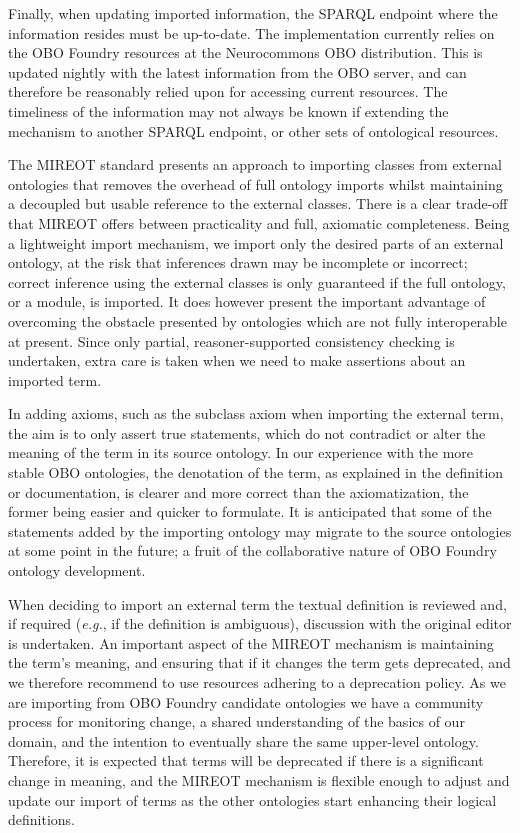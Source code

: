 \documentclass[jou]{ao2e}%
\begin{document}
Finally, when updating imported information, the SPARQL endpoint where the information resides must be up-to-date. The implementation currently relies on the \ac{OBO} Foundry resources at the Neurocommons \ac{OBO} distribution. This is updated nightly with the latest information from the \ac{OBO} server, and can therefore be reasonably relied upon for accessing current resources. The timeliness of the information may not always be known if extending the mechanism to another SPARQL endpoint, or other sets of ontological resources.

The \ac{MIREOT} standard presents an approach to importing classes from external ontologies that removes the overhead of full ontology imports whilst maintaining a decoupled but usable reference to the external classes. There is a clear trade-off that \ac{MIREOT} offers between practicality and full, axiomatic completeness. Being a lightweight import mechanism, we import only the desired parts of an external ontology, at the risk that inferences drawn may be incomplete or incorrect; correct inference using the external classes is only guaranteed if the full ontology, or a module, is imported. It does however present the important advantage of overcoming the obstacle presented by ontologies which are not fully interoperable at present.
Since only partial, reasoner-supported consistency checking is undertaken, extra care is taken when we need to make assertions about an imported term.

In adding axioms, such as the subclass axiom when importing the external term, the aim is to only assert true statements, which do not contradict or alter the meaning of the term in its source ontology.
In our experience with the more stable OBO ontologies, the denotation of the term, as explained in the definition or documentation, is clearer and more correct than the axiomatization, the former being easier and quicker to formulate.
It is anticipated that some of the statements added by the importing ontology may migrate to the source ontologies at some point in the future; a fruit of the collaborative nature of OBO Foundry ontology development.

When deciding to import an external term the textual definition is reviewed and, if required (\emph{e.g.}, if the definition is ambiguous), discussion with the original editor is undertaken.
An important aspect of the MIREOT mechanism is maintaining the term's meaning, and ensuring that if it changes the term gets deprecated, and we therefore recommend to use resources adhering to a deprecation policy.
As we are importing from \ac{OBO} Foundry candidate ontologies we have a community process for monitoring change, a shared understanding of the basics of our domain, and the intention to eventually share the same upper-level ontology. 
Therefore, it is expected that terms will be deprecated if there is a significant change in meaning, and the MIREOT mechanism is flexible enough to adjust and update our import of terms as the other ontologies start enhancing their logical definitions.
\end{document}
